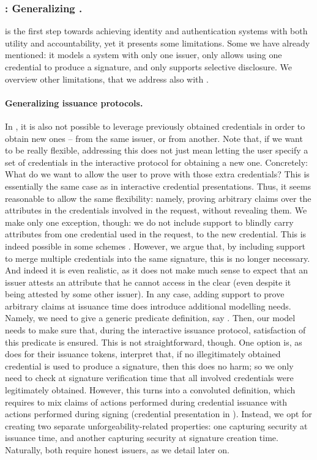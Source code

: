 \subsubsection{\UAS: Generalizing \GSAC.} %
\GSAC is the first step towards achieving identity and authentication systems
with both utility and accountability, yet it presents some limitations. Some we
have already mentioned: it models a system with only one issuer, only allows
using one credential to produce a signature, and only supports selective
disclosure. We overview other limitations, that we address also with \UAS.

\paragraph{Generalizing issuance protocols.} %
In \GSAC, it is also not possible to leverage previously obtained credentials in
order to obtain new ones -- from the same issuer, or from another. Note that, if
we want to be really flexible, addressing this does not just mean letting the
user specify a set of credentials in the interactive protocol for obtaining a
new one. Concretely: What do we want to allow the user to prove with those extra
credentials? This is essentially the same case as in interactive credential
presentations. Thus, it seems reasonable to allow the same flexibility: namely,
proving arbitrary claims over the attributes in the credentials involved in the
request, without revealing them. We make only one exception, though: we do not
include support to blindly carry attributes from one credential used in the
request, to the new credential. This is indeed possible in some schemes
\needcite. However, we argue that, by including support to merge multiple
credentials into the same signature, this is no longer necessary. And indeed
it is even realistic, as it does not make much sense to expect that an issuer
attests an attribute that he cannot access in the clear (even despite it being
attested by some other issuer). In any case, adding support to prove arbitrary
claims at issuance time does introduce additional modelling needs. Namely, we
need to give a generic predicate definition, say \fissue. Then, our model needs
to make sure that, during the interactive issuance protocol, satisfaction of
this predicate is ensured. This is not straightforward, though. One option is,
as \cite{ckl+15} does for their issuance tokens, interpret that, if no
illegitimately obtained credential is used to produce a signature, then this
does no harm; so we only need to check at signature verification time that all
involved credentials were legitimately obtained. However, this turns into a
convoluted definition, which requires to mix claims of actions performed during
credential issuance with actions performed during signing (credential
presentation in \cite{ckl+15}). Instead, we opt for creating two separate
unforgeability-related properties: one capturing security at issuance time, and
another capturing security at signature creation time. Naturally, both require
honest issuers, as we detail later on.

